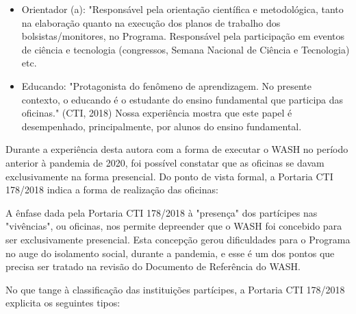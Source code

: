 \begin{itemize}
\item Orientador (a): "Responsável pela orientação científica e metodológica, tanto na elaboração quanto na execução dos planos de trabalho dos bolsistas/monitores, no Programa. Responsável pela participação em eventos de ciência e tecnologia (congressos, Semana Nacional de Ciência e Tecnologia) etc.
\item Educando: "Protagonista do fenômeno de aprendizagem. No presente contexto, o educando é o estudante do ensino fundamental que participa das oficinas." (CTI, 2018) Nossa experiência mostra que este papel é desempenhado, principalmente, por alunos do ensino fundamental.
\end{itemize}

Durante a experiência desta autora com a forma de executar o WASH no período anterior à pandemia de 2020, foi possível constatar que as oficinas se davam exclusivamente na forma presencial. Do ponto de vista formal, a Portaria CTI 178/2018 indica  a forma de realização das oficinas:


\noindent\begin{center}\mbox{\centering{}}\end{center}


A ênfase dada pela Portaria CTI 178/2018 à "presença" dos partícipes nas "vivências", ou oficinas, nos permite depreender que o WASH foi concebido para ser exclusivamente presencial. Esta concepção gerou dificuldades para o Programa no auge do isolamento social, durante a pandemia, e esse é um dos pontos que precisa ser tratado na revisão do Documento de Referência do WASH.

No que tange à classificação das instituições partícipes, a Portaria CTI 178/2018 explicita os seguintes tipos:


